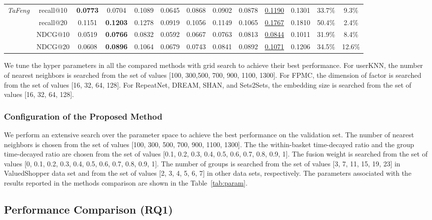\documentclass[sigconf]{acmart}
\begin{document}
\begin{table*}[ht]
{\begin{tabular}{lccccccccc|ccc}
\midrule
\multirow{4}{*}{\emph{TaFeng}}&recall@10 &\textbf{0.0773}&0.0704&0.1089&0.0645&0.0868&0.0902&0.0878&\underline{0.1190}&0.1301&33.7\%&9.3\%\\
&recall@20 &0.1151&\textbf{0.1203}&0.1278&0.0919&0.1056&0.1149&0.1065&\underline{0.1767}&0.1810&50.4\%&2.4\%\\
&NDCG@10 &0.0519&\textbf{0.0766}&0.0832&0.0592&0.0667&0.0763&0.0813&\underline{0.0844}&0.1011&31.9\%&8.4\%\\
&NDCG@20  &0.0608&\textbf{0.0896}&0.1064&0.0679&0.0743&0.0841&0.0892&\underline{0.1071}&0.1206&34.5\%&12.6\%\\
\bottomrule
\end{tabular}
}
\label{tab:comp1}
\end{table*}


We tune the hyper parameters in all the compared methods with grid search to achieve their best performance. For userKNN, the number of nearest neighbors is searched from the set of values [100, 300,500, 700, 900, 1100, 1300]. For FPMC, the dimension of factor is searched from the set of values [16, 32, 64, 128]. For RepeatNet, DREAM, SHAN, and Sets2Sets, the  embedding size is searched from the set of values [16, 32, 64, 128]. 





\subsubsection{Configuration of the Proposed  Method}
We  perform an extensive search over the parameter space to achieve the best performance on the validation  set. The number of nearest neighbors  is chosen from the set of values [100, 300, 500, 700, 900, 1100, 1300]. The the within-basket time-decayed ratio   and the group  time-decayed ratio  are chosen from the set of values [0.1, 0.2, 0.3, 0.4,  0.5, 0.6, 0.7, 0.8, 0.9, 1].  The fusion weight   is searched from the set of values [0, 0.1, 0.2, 0.3, 0.4, 0.5, 0.6, 0.7, 0.8, 0.9, 1]. The  number of groups   is  searched from the set of values [3, 7, 11, 15, 19, 23] in ValuedShopper data set and from the set of values [2, 3, 4, 5, 6, 7] in other data sets,  respectively. The parameters associated with the  results  reported in  the methods  comparison are shown in the Table~\ref{tab:param}.




\subsection{Performance Comparison (RQ1)}
\end{document}
